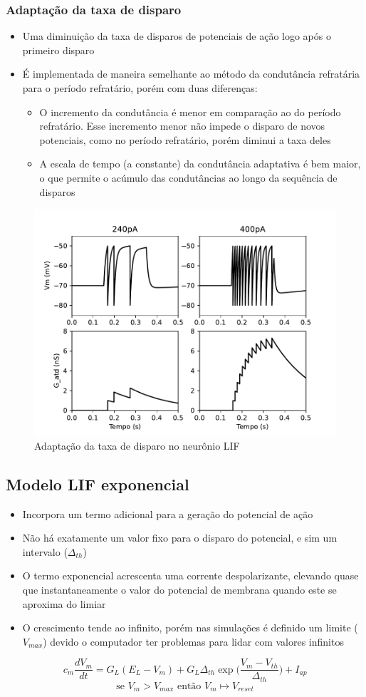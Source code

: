\subsubsection{Adaptação da taxa de disparo}
\begin{itemize}
	\item Uma diminuição da taxa de disparos de potenciais de ação logo após o primeiro disparo
	\item É implementada de maneira semelhante ao método da condutância refratária para o período refratário, porém com duas diferenças:
	\begin{itemize}
		\item O incremento da condutância é menor em comparação ao do período refratário. Esse incremento menor não impede o disparo de novos potenciais, como no período refratário, porém diminui a taxa deles
		\item A escala de tempo (a constante) da condutância adaptativa é bem maior, o que permite o acúmulo das condutâncias ao longo da sequência de disparos
	\end{itemize}
\end{itemize}

\begin{figure}[h!]
	\centering
	\caption{Adaptação da taxa de disparo no neurônio LIF}
	\label{fig:lifatd}
	\includegraphics[width=0.7\linewidth]{figs/lif_atd}
\end{figure}

\subsection{Modelo LIF exponencial}
\begin{itemize}
	\item Incorpora um termo adicional para a geração do potencial de ação
	\item Não há exatamente um valor fixo para o disparo do potencial, e sim um intervalo ($\Delta_{th}$)
	\item O termo exponencial acrescenta uma corrente despolarizante, elevando quase que instantaneamente o valor do potencial de membrana quando este se aproxima do limiar
	\item O crescimento tende ao infinito, porém nas simulações é definido um limite ($V_{max}$) devido o computador ter problemas para lidar com valores infinitos
\end{itemize}
$$
c_m\frac{dV_m}{dt} = G_L(E_L-V_m) + G_L\Delta_{th}\exp\Big(\frac{V_m-V_{th}}{\Delta_{th}}\Big) + I_{ap}
$$$$
\text{se } V_m > V_{max} \text{ então } V_m\mapsto V_{reset}
$$

